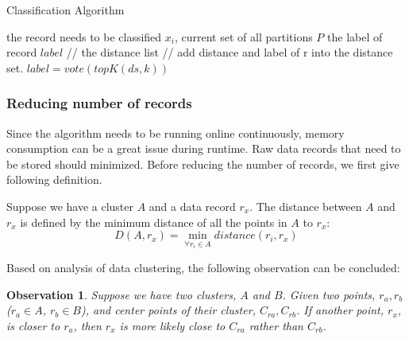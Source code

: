 \documentclass[runningheads]{llncs}
\newtheorem{observation}{Observation}
\begin{document}
	\begin{algorithm}
		\caption{Classification Algorithm} \label{algorithm:classification}
		\begin{algorithmic}
			\REQUIRE the record needs to be classified $x_i$, current set of all partitions $P$
			\ENSURE the label of record $label$
			 // the distance list
			 // add distance and label of r into the distance set.
			\STATE $label = vote(topK(ds, k))$
			\ENDFOR
			\ENDFOR
		\end{algorithmic}
	\end{algorithm}
	
	\subsubsection{Reducing number of records}
	Since the algorithm needs to be running online continuously, memory consumption can be a great issue during runtime. Raw data records that need to be stored should minimized. Before reducing the number of records, we first give following definition.
	
	\begin{definition}
		
		Suppose we have a cluster $A$ and a data record $r_x$. The distance between $A$ and $r_x$ is defined by the minimum distance of all the points in $A$ to $r_x$:
		\begin{displaymath}
		D(A, r_x) = \min_{\forall r_i \in A} distance(r_i, r_x) 
		\end{displaymath}
	\end{definition}
	
	Based on analysis of data clustering, the following observation can be concluded:
	
	\begin{observation} \label{observation}
		Suppose we have two clusters, $A$ and $B$. Given two points, $r_a, r_b$ ($r_a \in A$, $r_b \in B$), and center points of their cluster, $C_{ra}, C_{rb}$. If another point, $r_x$, is closer to $r_a$, then $r_x$ is more likely close to $C_{ra}$ rather than $C_{rb}$.
	\end{observation}
	
\end{document}
